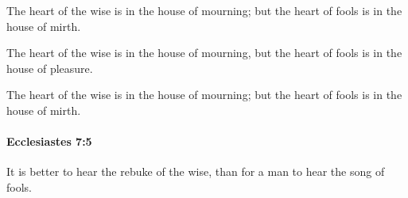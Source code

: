 			\begin{versebox}
					\item[BHS] 
					\item[LXX] 
					\item[ASV] The heart of the wise is in the house of mourning; but the heart of fools is in the house of mirth.
					\item[NIV] The heart of the wise is in the house of mourning, but the heart of fools is in the house of pleasure.
					\item[NRSV] The heart of the wise is in the house of mourning; but the heart of fools is in the house of mirth.
			\end{versebox}

		\paragraph{Ecclesiastes 7:5} %
			\label{ECCLESIASTES-7-5}

			It is better to hear the rebuke of the wise, than for a man to hear the song of fools.

